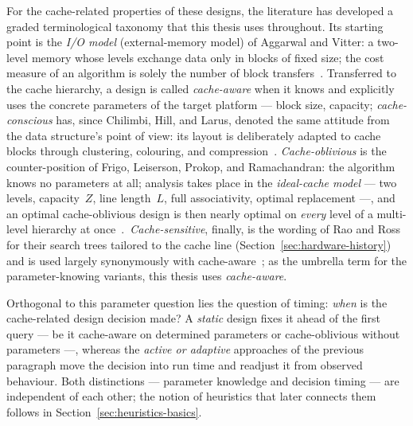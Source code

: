 For the cache-related properties of these designs, the literature has developed a graded
terminological taxonomy that this thesis uses throughout. Its starting point is the \emph{I/O model}
(external-memory model) of Aggarwal and Vitter: a two-level memory whose levels exchange data only
in blocks of fixed size; the cost measure of an algorithm is solely the number of block
transfers~\cite{aggarwal1988io}. Transferred to the cache hierarchy, a design is called
\emph{cache-aware} when it knows and explicitly uses the concrete parameters of the target platform
--- block size, capacity; \emph{cache-conscious} has, since Chilimbi, Hill, and Larus, denoted the
same attitude from the data structure's point of view: its layout is deliberately adapted to cache
blocks through clustering, colouring, and compression~\cite{chilimbi1999layout}.
\emph{Cache-oblivious} is the counter-position of Frigo, Leiserson, Prokop, and Ramachandran: the
algorithm knows no parameters at all; analysis takes place in the \emph{ideal-cache model} --- two
levels, capacity~$Z$, line length~$L$, full associativity, optimal replacement ---, and an optimal
cache-oblivious design is then nearly optimal on \emph{every} level of a multi-level hierarchy at
once~\cite{frigo1999cache}.\ \emph{Cache-sensitive}, finally, is the wording of Rao and Ross for
their search trees tailored to the cache line (Section~\ref{sec:hardware-history}) and is used
largely synonymously with cache-aware~\cite{rao1999css,rao2000csb}; as the umbrella term for the
parameter-knowing variants, this thesis uses \emph{cache-aware}.

Orthogonal to this parameter question lies the question of timing: \emph{when} is the cache-related
design decision made? A \emph{static} design fixes it ahead of the first query --- be it
cache-aware on determined parameters or cache-oblivious without parameters ---, whereas the
\emph{active or adaptive} approaches of the previous paragraph move the decision into run time and
readjust it from observed behaviour. Both distinctions --- parameter knowledge and decision timing
--- are independent of each other; the notion of heuristics that later connects them follows in
Section~\ref{sec:heuristics-basics}.

